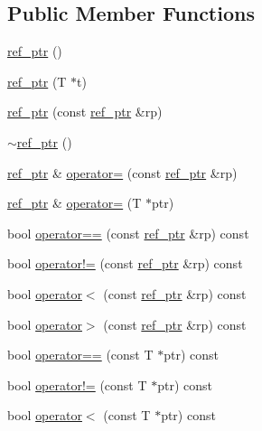 \subsection*{Public Member Functions}
\begin{DoxyCompactItemize}
\item 
\hyperlink{classSLB_1_1ref__ptr_ad8b26c8b9e8248d569ffe6cebb26cfa5}{ref\+\_\+ptr} ()
\item 
\hyperlink{classSLB_1_1ref__ptr_ab7a7c92c6fe0c9d1b00979ce3a1c8ca8}{ref\+\_\+ptr} (T $\ast$t)
\item 
\hyperlink{classSLB_1_1ref__ptr_a2a8a35dd3efee516b479803e10e927d6}{ref\+\_\+ptr} (const \hyperlink{classSLB_1_1ref__ptr}{ref\+\_\+ptr} \&rp)
\item 
\hyperlink{classSLB_1_1ref__ptr_a618417a33485fcdba860f036fa1f2777}{$\sim$ref\+\_\+ptr} ()
\item 
\hyperlink{classSLB_1_1ref__ptr}{ref\+\_\+ptr} \& \hyperlink{classSLB_1_1ref__ptr_a13873d07332198225ec80d3c6e814b54}{operator=} (const \hyperlink{classSLB_1_1ref__ptr}{ref\+\_\+ptr} \&rp)
\item 
\hyperlink{classSLB_1_1ref__ptr}{ref\+\_\+ptr} \& \hyperlink{classSLB_1_1ref__ptr_a244283f1c4d42a6a3d591bb2d0b5fb3a}{operator=} (T $\ast$ptr)
\item 
bool \hyperlink{classSLB_1_1ref__ptr_a15abcb7ff427eab6dbc51e0d1c24d30c}{operator==} (const \hyperlink{classSLB_1_1ref__ptr}{ref\+\_\+ptr} \&rp) const 
\item 
bool \hyperlink{classSLB_1_1ref__ptr_a92413f632b5ae941853e388a0accd286}{operator!=} (const \hyperlink{classSLB_1_1ref__ptr}{ref\+\_\+ptr} \&rp) const 
\item 
bool \hyperlink{classSLB_1_1ref__ptr_a75eba56194d60549b6a612aa22c10764}{operator$<$} (const \hyperlink{classSLB_1_1ref__ptr}{ref\+\_\+ptr} \&rp) const 
\item 
bool \hyperlink{classSLB_1_1ref__ptr_a819517ee435c708e231c10f84e6cf855}{operator$>$} (const \hyperlink{classSLB_1_1ref__ptr}{ref\+\_\+ptr} \&rp) const 
\item 
bool \hyperlink{classSLB_1_1ref__ptr_a26366165e0cec2f0b26443824f12e7b4}{operator==} (const T $\ast$ptr) const 
\item 
bool \hyperlink{classSLB_1_1ref__ptr_a15af9a4644a1302df2dfeae27b0f9ec4}{operator!=} (const T $\ast$ptr) const 
\item 
bool \hyperlink{classSLB_1_1ref__ptr_a72a85f4045c4f9b9f5365dea249b3674}{operator$<$} (const T $\ast$ptr) const 
\item 

\end{DoxyCompactItemize}
